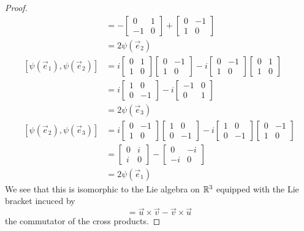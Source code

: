 \begin{proof}
\begin{subequations}
\begin{align}
&=-\begin{bmatrix}0&1\\-1&0\end{bmatrix}
+\begin{bmatrix}0&-1\\1&0\end{bmatrix}\\
&=2\psi(\vec{e}_{2})\\
[\psi(\vec{e}_{1}),\psi(\vec{e}_{2})]&=i
\begin{bmatrix}0 & 1\\1 & 0\end{bmatrix}\begin{bmatrix}0&-1\\1&0\end{bmatrix}
-i\begin{bmatrix}0&-1\\1&0\end{bmatrix}
\begin{bmatrix}0 & 1\\1 & 0\end{bmatrix}\\
&=i\begin{bmatrix}1&0\\0&-1\end{bmatrix}
-i\begin{bmatrix}-1&0\\0&1\end{bmatrix}\\
&=2\psi(\vec{e}_{3})\\
[\psi(\vec{e}_{2}),\psi(\vec{e}_{3})]&=i\begin{bmatrix}0&-1\\1&0\end{bmatrix}\begin{bmatrix}1&0\\0&-1\end{bmatrix}
-i\begin{bmatrix}1&0\\0&-1\end{bmatrix}\begin{bmatrix}0&-1\\1&0\end{bmatrix}\\
&=\begin{bmatrix}0&i\\i&0\end{bmatrix}-\begin{bmatrix}0&-i\\-i&0\end{bmatrix}\\
&=2\psi(\vec{e}_{1})
\end{align}
\end{subequations}
We see that this is isomorphic to the Lie algebra on
$\Bbb{R}^{3}$ equipped with the Lie bracket incuced by
\begin{equation}
[\vec{u},\vec{v}]=\vec{u}\times\vec{v}-\vec{v}\times\vec{u}
\end{equation}
the commutator of the cross products. 
\end{proof}

